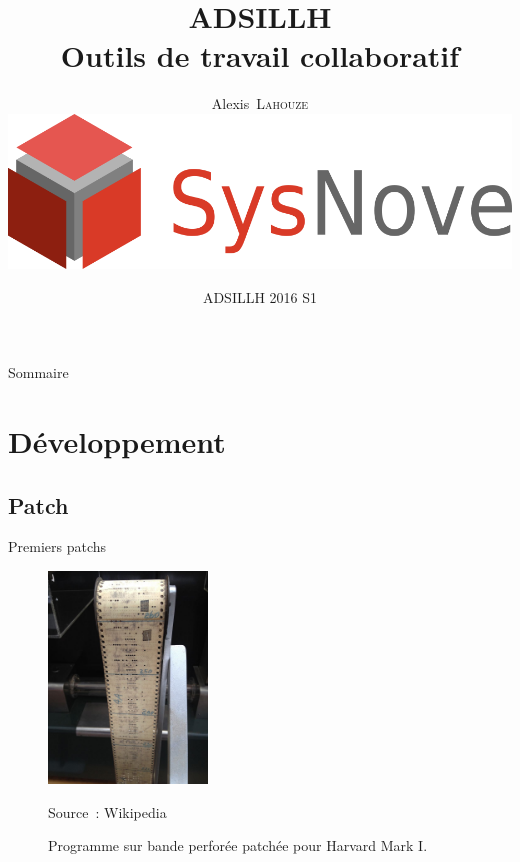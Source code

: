 \documentclass[10pt,xcolor={dvipsnames}]{beamer}
\title[Outils de travail collaboratif]{{\small ADSILLH}\\Outils de travail collaboratif}
\author[Alexis Lahouze]{Alexis~\textsc{Lahouze}\\
  \medskip
  \includegraphics[scale=0.5]{logo-sysnove}
}
\institute[Sysnove]{}
\date{ADSILLH 2016 S1}
\begin{document}
\begin{frame}[plain]
  \titlepage
\end{frame}

\begin{frame}[squeeze]{Sommaire}
  \tableofcontents[sectionstyle=show, subsectionstyle=show/show/show]
\end{frame}

\section{Développement}
\subsection{Patch}

\begin{frame}{Premiers patchs}
 \begin{figure}
   \caption{Programme sur bande perforée patchée pour Harvard Mark I.}
   \includegraphics[height=160pt]{Harvard_Mark_I_program_tape}\par
   \tiny Source~: Wikipedia
 \end{figure}
\end{frame}
\end{document}
